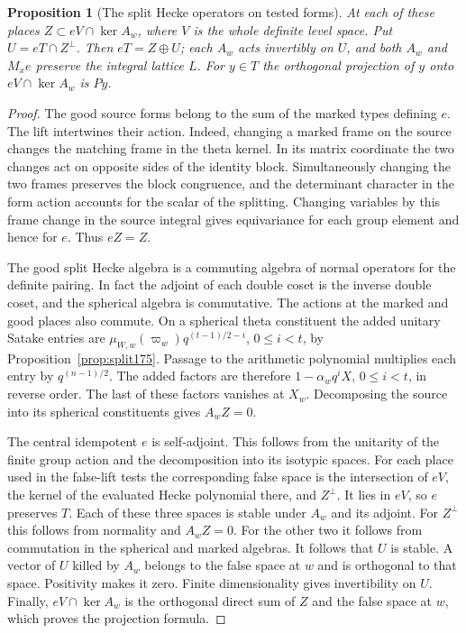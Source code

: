 \documentclass[a4paper,11pt]{article}
\newtheorem{proposition}{Proposition}[section]
\theoremstyle{definition}
\theoremstyle{remark}
\numberwithin{equation}{section}
\begin{document}
\begin{proposition}[The split Hecke operators on tested forms]
\leavevmode\label{prop:testedkernel785}
At each of these places \(Z\subset eV\cap\ker A_w\), where
\(V\) is the whole definite level space. Put
\(U=eT\cap Z^\perp\). Then \(eT=Z\oplus U\);
each \(A_w\) acts invertibly on \(U\), and both \(A_w\)
and \(M_xe\) preserve the integral lattice \(L\).
For \(y\in T\) the orthogonal projection of \(y\) onto
\(eV\cap\ker A_w\) is \(Py\).
\end{proposition}
\begin{proof}
The good source forms belong to the sum of the marked
types defining \(e\). The lift intertwines their action.
Indeed, changing a marked frame on the source changes
the matching frame in the theta kernel. In its matrix
coordinate the two changes act on opposite sides of the
identity block. Simultaneously changing the two frames
preserves the block congruence, and the determinant
character in the form action accounts for the scalar
of the splitting. Changing variables by this frame
change in the source integral gives equivariance for
each group element and hence for \(e\). Thus \(eZ=Z\).

The good split Hecke algebra is a commuting algebra of
normal operators for the definite pairing. In fact the
adjoint of each double coset is the inverse double coset,
and the spherical algebra is commutative. The actions at
the marked and good places also commute. On a spherical
theta constituent the added unitary Satake entries are
\(\mu_{W,w}(\varpi_w)q^{(t-1)/2-i}\), \(0\le i<t\), by
Proposition~\ref{prop:split175}. Passage to the
arithmetic polynomial multiplies each entry by
\(q^{(n-1)/2}\). The added factors are therefore
\(1-\alpha_w q^i X\), \(0\le i<t\), in reverse order.
The last of these factors vanishes at \(X_w\). Decomposing
the source into its spherical constituents gives \(A_wZ=0\).

The central idempotent \(e\) is self-adjoint. This follows
from the unitarity of the finite group action and the
decomposition into its isotypic spaces. For each place
used in the false-lift tests the corresponding false
space is the intersection of \(eV\), the kernel of the
evaluated Hecke polynomial there, and \(Z^\perp\).
It lies in \(eV\), so \(e\) preserves \(T\). Each of
these three spaces is stable under \(A_w\) and its
adjoint. For \(Z^\perp\) this follows from normality
and \(A_wZ=0\). For the other two it follows from
commutation in the spherical and marked algebras.
It follows that \(U\) is stable. A vector of \(U\)
killed by \(A_w\) belongs to the false space at \(w\)
and is orthogonal to that space. Positivity makes it
zero. Finite dimensionality gives invertibility on \(U\).
Finally, \(eV\cap\ker A_w\) is the orthogonal direct
sum of \(Z\) and the false space at \(w\), which proves
the projection formula.


\end{proof}
\end{document}
